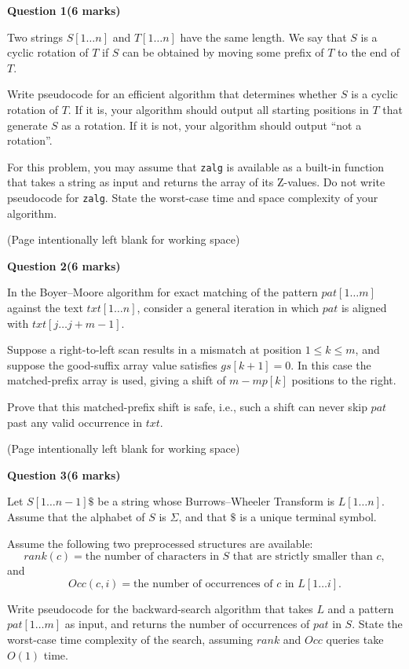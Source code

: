 \documentclass[12pt,letterpaper]{article}
\newcommand{\marksbox}[1]{%
  \vfill
  \begin{flushright}
    \fbox{\parbox[c][1.1cm][c]{1.3cm}{\centering #1}}
  \end{flushright}
}
\newcommand{\questiontitle}[2]{%
  \textbf{Question #1}\hfill\textbf{(#2 marks)}
}
\newcommand{\workingpage}{%
  \newpage
  \begin{center}
    (Page intentionally left blank for working space)
  \end{center}
}
\begin{document}
\newpage

\questiontitle{1}{6}

Two strings $S[1 \ldots n]$ and $T[1 \ldots n]$ have the same length. We say that
$S$ is a cyclic rotation of $T$ if $S$ can be obtained by moving some prefix of
$T$ to the end of $T$.

Write pseudocode for an efficient algorithm that determines whether $S$ is a
cyclic rotation of $T$. If it is, your algorithm should output all starting
positions in $T$ that generate $S$ as a rotation. If it is not, your algorithm
should output ``not a rotation''.

For this problem, you may assume that \texttt{zalg} is available as a built-in
function that takes a string as input and returns the array of its Z-values. Do
not write pseudocode for \texttt{zalg}. State the worst-case time and space
complexity of your algorithm.

\marksbox{6}

\workingpage
\newpage

\questiontitle{2}{6}

In the Boyer--Moore algorithm for exact matching of the pattern
$pat[1 \ldots m]$ against the text $txt[1 \ldots n]$, consider a general
iteration in which $pat$ is aligned with $txt[j \ldots j+m-1]$.

Suppose a right-to-left scan results in a mismatch at position
$1 \leq k \leq m$, and suppose the good-suffix array value satisfies
$gs[k+1] = 0$. In this case the matched-prefix array is used, giving a shift of
$m - mp[k]$ positions to the right.

Prove that this matched-prefix shift is safe, i.e., such a shift can never skip
$pat$ past any valid occurrence in $txt$.

\marksbox{6}

\workingpage
\newpage

\questiontitle{3}{6}

Let $S[1 \ldots n-1]\$$ be a string whose Burrows--Wheeler Transform is
$L[1 \ldots n]$. Assume that the alphabet of $S$ is $\Sigma$, and that $\$$ is a
unique terminal symbol.

Assume the following two preprocessed structures are available:
\[
  rank(c) = \text{the number of characters in } S \text{ that are strictly
  smaller than } c,
\]
and
\[
  Occ(c,i) = \text{the number of occurrences of } c \text{ in } L[1 \ldots i].
\]

Write pseudocode for the backward-search algorithm that takes $L$ and a pattern
$pat[1 \ldots m]$ as input, and returns the number of occurrences of $pat$ in
$S$. State the worst-case time complexity of the search, assuming
$rank$ and $Occ$ queries take $O(1)$ time.
\end{document}
